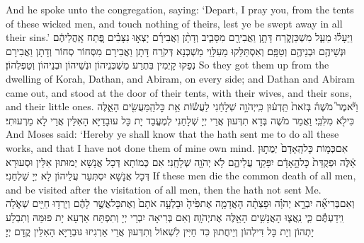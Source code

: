 {And he spoke unto the congregation, saying: ‘Depart, I pray you, from the tents of these wicked men, and touch nothing of theirs, lest ye be swept away in all their sins.’}{}
{וַיֵּעָל֗וּ מֵעַ֧ל מִשְׁכַּן\maqqaf קֹ֛רַח דָּתָ֥ן וַאֲבִירָ֖ם מִסָּבִ֑יב וְדָתָ֨ן וַאֲבִירָ֜ם יָצְא֣וּ נִצָּבִ֗ים פֶּ֚תַח אׇֽהֳלֵיהֶ֔ם וּנְשֵׁיהֶ֥ם וּבְנֵיהֶ֖ם וְטַפָּֽם׃}
{וְאִסְתַּלַּקוּ מֵעִלָּוֵי מַשְׁכְּנָא דְּקֹרַח דָּתָן וַאֲבִירָם מִסְּחוֹר סְחוֹר וְדָתָן וַאֲבִירָם נְפַקוּ קָיְמִין בִּתְרַע מַשְׁכְּנֵיהוֹן וּנְשֵׁיהוֹן וּבְנֵיהוֹן וְטַפְלְהוֹן׃}
{So they got them up from the dwelling of Korah, Dathan, and Abiram, on every side; and Dathan and Abiram came out, and stood at the door of their tents, with their wives, and their sons, and their little ones.}{}
{וַיֹּ֘אמֶר֮ מֹשֶׁה֒ בְּזֹאת֙ תֵּֽדְע֔וּן כִּֽי\maqqaf יְהֹוָ֣ה שְׁלָחַ֔נִי לַעֲשׂ֕וֹת אֵ֥ת כׇּל\maqqaf הַֽמַּעֲשִׂ֖ים הָאֵ֑לֶּה כִּי\maqqaf לֹ֖א מִלִּבִּֽי׃}
{וַאֲמַר מֹשֶׁה בְּדָא תִדְּעוּן אֲרֵי יְיָ שְׁלָחַנִי לְמֶעֱבַד יָת כָּל עוּבָדַיָּא הָאִלֵּין אֲרֵי לָא מֵרְעוּתִי׃}
{And Moses said: ‘Hereby ye shall know that the \lord\space hath sent me to do all these works, and that I have not done them of mine own mind.}{}
{אִם\maqqaf כְּמ֤וֹת כׇּל\maqqaf הָֽאָדָם֙ יְמֻת֣וּן אֵ֔לֶּה וּפְקֻדַּת֙ כׇּל\maqqaf הָ֣אָדָ֔ם יִפָּקֵ֖ד עֲלֵיהֶ֑ם לֹ֥א יְהֹוָ֖ה שְׁלָחָֽנִי׃}
{אִם כְּמוֹתָא דְּכָל אֲנָשָׁא יְמוּתוּן אִלֵּין וּסְעוּרָא דְּכָל אֲנָשָׁא יִסְתְּעַר עֲלֵיהוֹן לָא יְיָ שַׁלְחַנִי׃}
{If these men die the common death of all men, and be visited after the visitation of all men, then the \lord\space hath not sent Me.}{}
{וְאִם\maqqaf בְּרִיאָ֞ה יִבְרָ֣א יְהֹוָ֗ה וּפָצְתָ֨ה הָאֲדָמָ֤ה אֶת\maqqaf פִּ֙יהָ֙ וּבָלְעָ֤ה אֹתָם֙ וְאֶת\maqqaf כׇּל\maqqaf אֲשֶׁ֣ר לָהֶ֔ם וְיָרְד֥וּ חַיִּ֖ים שְׁאֹ֑לָה וִֽידַעְתֶּ֕ם כִּ֧י נִֽאֲצ֛וּ הָאֲנָשִׁ֥ים הָאֵ֖לֶּה אֶת\maqqaf יְהֹוָֽה׃}
{וְאִם בְּרִיאָה יִבְרֵי יְיָ וְתִפְתַּח אַרְעָא יָת פּוּמַּהּ וְתִבְלַע יָתְהוֹן וְיָת כָּל דִּילְהוֹן וְיֵיחֲתוּן כִּד חַיִּין לִשְׁאוֹל וְתִדְּעוּן אֲרֵי אַרְגִיזוּ גּוּבְרַיָּא הָאִלֵּין קֳדָם יְיָ׃}
